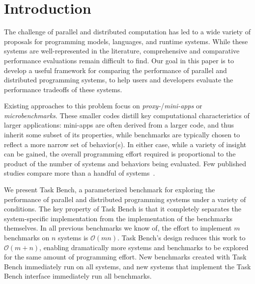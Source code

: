 \section{Introduction}
\label{sec:introduction}

The challenge of parallel and distributed computation has led to a
wide variety of proposals for programming models, languages, and
runtime systems. While these systems are well-represented in the literature, comprehensive and comparative performance evaluations
remain difficult to find. Our
goal in this paper is to develop a useful framework for
comparing the performance of parallel and distributed programming
systems, to help users and developers evaluate the performance tradeoffs of these systems.

{\color{blue}

Existing approaches to this problem focus on \emph{proxy-}/\emph{mini-apps}
or \emph{microbenchmarks}. These smaller codes distill key
computational characteristics of larger applications: mini-apps are
often derived from a larger code, and thus inherit some subset of its
properties, while benchmarks are typically chosen to reflect a more
narrow set of behavior(s). In either case, while a variety of insight
can be gained, the overall programming effort required is proportional to the
product of the number of systems and behaviors being
evaluated. Few published studies compare more than a
handful of systems~\cite{LULESH13, Deakin19}.

}


We present Task Bench, a parameterized benchmark for exploring the performance
of parallel and distributed programming systems under a
variety of conditions.  The key property of Task Bench is that it completely separates
the system-specific implementation from the implementation
of the benchmarks themselves.
In all previous benchmarks we know of, the effort to implement $m$ benchmarks on $n$
systems is $\mathcal{O}(mn)$.  Task Bench's design reduces this work to $\mathcal{O}(m + n)$,
enabling dramatically more systems and benchmarks to be explored for the same amount of programming
effort.  New benchmarks created with Task Bench
immediately run on all systems, and new systems that implement the Task Bench interface immediately run all
benchmarks. 


